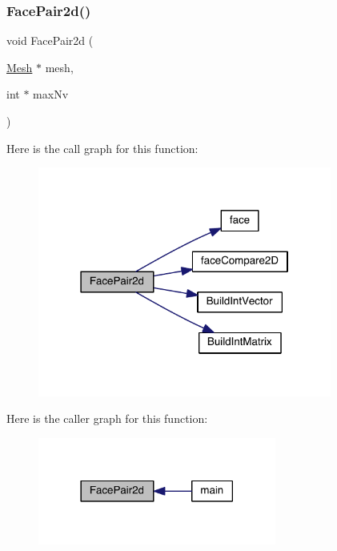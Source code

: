 \subsubsection{\texorpdfstring{Face\+Pair2d()}{FacePair2d()}}
{\footnotesize\ttfamily void Face\+Pair2d (\begin{DoxyParamCaption}\item[{\hyperlink{a00557_aeffbe0891ab73a4d8964c9cb7978426e}{Mesh} $\ast$}]{mesh,  }\item[{int $\ast$}]{max\+Nv }\end{DoxyParamCaption})}

Here is the call graph for this function\+:\nopagebreak
\begin{figure}[H]
\begin{center}
\leavevmode
\includegraphics[width=274pt]{a00554_a73ad96b82acf2bf80fd24823a58b3f14_cgraph}
\end{center}
\end{figure}
Here is the caller graph for this function\+:\nopagebreak
\begin{figure}[H]
\begin{center}
\leavevmode
\includegraphics[width=222pt]{a00554_a73ad96b82acf2bf80fd24823a58b3f14_icgraph}
\end{center}
\end{figure}
\mbox{\label{a00554_aaf4bbe0ed66b39808512cc6e5c09c989}} 
